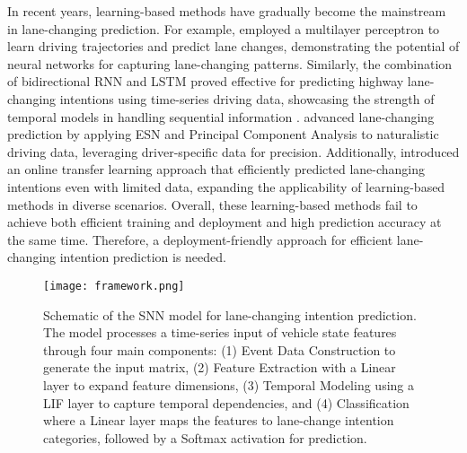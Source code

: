 In recent years, learning-based methods have gradually become the mainstream in lane-changing prediction.
For example, \cite{tomar2010prediction} employed a multilayer perceptron to learn driving trajectories and predict lane changes, demonstrating the potential of neural networks for capturing lane-changing patterns. Similarly, the combination of bidirectional RNN and LSTM proved effective for predicting highway lane-changing intentions using time-series driving data, showcasing the strength of temporal models in handling sequential information \cite{xing2020ensemble}.
\cite{griesbach2020prediction} advanced lane-changing prediction by applying ESN and Principal Component Analysis to naturalistic driving data, leveraging driver-specific data for precision. Additionally, \cite{zhang2021target} introduced an online transfer learning approach that efficiently predicted lane-changing intentions even with limited data, expanding the applicability of learning-based methods in diverse scenarios.
Overall, these learning-based methods fail to achieve both efficient training and deployment and high prediction accuracy at the same time.
Therefore, a deployment-friendly approach for efficient lane-changing intention prediction is needed.

\begin{figure*}[t]
    \centering
    \texttt{[image: framework.png]}
    \caption{Schematic of the SNN model for lane-changing intention prediction. The model processes a time-series input of vehicle state features through four main components: (1) Event Data Construction to generate the input matrix, (2) Feature Extraction with a Linear layer to expand feature dimensions, (3) Temporal Modeling using a LIF layer to capture temporal dependencies, and (4) Classification where a Linear layer maps the features to lane-change intention categories, followed by a Softmax activation for prediction.}
    \label{framework}
\end{figure*}

